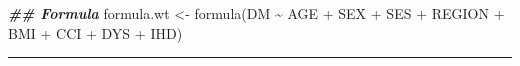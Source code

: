 \documentclass[
]{book}
\newenvironment{Shaded}{\begin{snugshade}}{\end{snugshade}}
\newcommand{\DocumentationTok}[1]{\textcolor[rgb]{0.56,0.35,0.01}{\textbf{\textit{#1}}}}
\newcommand{\FunctionTok}[1]{\textcolor[rgb]{0.00,0.00,0.00}{#1}}
\newcommand{\NormalTok}[1]{#1}
\newcommand{\OtherTok}[1]{\textcolor[rgb]{0.56,0.35,0.01}{#1}}
\newcommand{\SpecialCharTok}[1]{\textcolor[rgb]{0.00,0.00,0.00}{#1}}
\begin{document}
\begin{Shaded}
\begin{Highlighting}[]
\DocumentationTok{\#\# Formula}
\NormalTok{formula.wt }\OtherTok{\textless{}{-}} \FunctionTok{formula}\NormalTok{(DM }\SpecialCharTok{\textasciitilde{}}\NormalTok{ AGE }\SpecialCharTok{+}\NormalTok{ SEX }\SpecialCharTok{+}\NormalTok{ SES }\SpecialCharTok{+}\NormalTok{ REGION }\SpecialCharTok{+}\NormalTok{ BMI }\SpecialCharTok{+}\NormalTok{ CCI }\SpecialCharTok{+}\NormalTok{ DYS }\SpecialCharTok{+}\NormalTok{ IHD)}
\end{Highlighting}
\end{Shaded}

\begin{center}\rule{0.5\linewidth}{0.5pt}\end{center}

  
\end{document}
